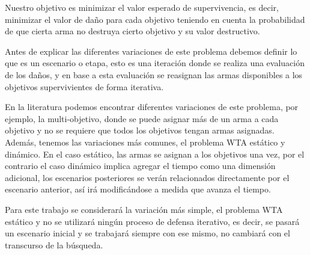 
Nuestro objetivo es minimizar el valor esperado de supervivencia, es decir, minimizar el valor de daño para cada objetivo teniendo en cuenta la probabilidad de que cierta arma no destruya cierto objetivo y su valor destructivo.

Antes de explicar las diferentes variaciones de este problema debemos definir lo que es un escenario o etapa, esto es una iteración donde se realiza una evaluación de los daños, y en base a esta evaluación se reasignan las armas disponibles a los objetivos supervivientes de forma iterativa.

En la literatura podemos encontrar diferentes variaciones de este problema, por ejemplo, la multi-objetivo, donde se puede asignar más de un arma a cada objetivo y no se requiere que todos los objetivos tengan armas asignadas. Además, tenemos las variaciones más comunes, el problema WTA estático y dinámico.
En el caso estático, las armas se asignan a los objetivos una vez, por el contrario el caso dinámico implica agregar el tiempo como una dimensión adicional, los escenarios posteriores se verán relacionados directamente por el escenario anterior, así irá modificándose a medida que avanza el tiempo.

Para este trabajo se considerará la variación más simple, el problema WTA estático y no se utilizará ningún proceso de defensa iterativo, es decir, se pasará un escenario inicial y se trabajará siempre con ese mismo, no cambiará con el transcurso de la búsqueda.


